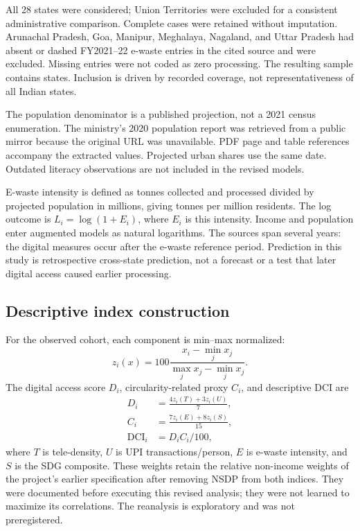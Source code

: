 \documentclass[11pt,a4paper]{article}
\begin{document}
All 28 states were considered; Union Territories were excluded for a consistent administrative comparison. Complete cases were retained without imputation. Arunachal Pradesh, Goa, Manipur, Meghalaya, Nagaland, and Uttar Pradesh had absent or dashed FY2021--22 e-waste entries in the cited source and were excluded. Missing entries were not coded as zero processing. The resulting sample contains \SampleN{} states. Inclusion is driven by recorded coverage, not representativeness of all Indian states.

The population denominator is a published projection, not a 2021 census enumeration. The ministry's 2020 population report was retrieved from a public mirror because the original URL was unavailable. PDF page and table references accompany the extracted values. Projected urban shares use the same date. Outdated literacy observations are not included in the revised models.

E-waste intensity is defined as tonnes collected and processed divided by projected population in millions, giving tonnes per million residents. The log outcome is $L_i=\log(1+E_i)$, where $E_i$ is this intensity. Income and population enter augmented models as natural logarithms. The sources span several years: the digital measures occur after the e-waste reference period. Prediction in this study is retrospective cross-state prediction, not a forecast or a test that later digital access caused earlier processing.

\subsection{Descriptive index construction}
For the observed cohort, each component is min--max normalized:
\begin{equation}
z_i(x)=100\frac{x_i-\min_j x_j}{\max_j x_j-\min_j x_j}.
\end{equation}
The digital access score $D_i$, circularity-related proxy $C_i$, and descriptive DCI are
\begin{align}
D_i &= \frac{4z_i(T)+3z_i(U)}{7},\\
C_i &= \frac{7z_i(E)+8z_i(S)}{15},\\
\mathrm{DCI}_i &= D_iC_i/100,
\end{align}
where $T$ is tele-density, $U$ is UPI transactions/person, $E$ is e-waste intensity, and $S$ is the SDG composite. These weights retain the relative non-income weights of the project's earlier specification after removing NSDP from both indices. They were documented before executing this revised analysis; they were not learned to maximize its correlations. The reanalysis is exploratory and was not preregistered.
\end{document}
